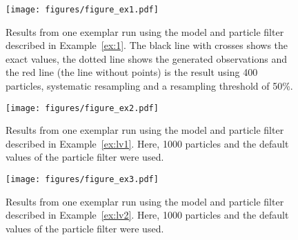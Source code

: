 \begin{landscape}
  \begin{figure}
    \centering
    \texttt{[image: figures/figure\_ex1.pdf]}
    \caption{Results from one exemplar run using the model and
      particle filter described in Example~\ref{ex:1}. The black line
      with crosses shows the exact values, the dotted line shows the
      generated observations and the red line (the line without
      points) is the result using 400 particles, systematic resampling
      and a resampling threshold of 50\%.}%
    \label{fig:ex1}
  \end{figure}
\end{landscape}

\begin{landscape}
  \begin{figure}
    \centering
    \texttt{[image: figures/figure\_ex2.pdf]}
    \caption{Results from one exemplar run using the model and
      particle filter described in Example~\ref{ex:lv1}. Here, 1000
      particles and the default values of the particle filter were
      used.}%
    \label{fig:ex2}
  \end{figure}
\end{landscape}

\begin{landscape}
  \begin{figure}
    \centering
    \texttt{[image: figures/figure\_ex3.pdf]}
    \caption{Results from one exemplar run using the model and
      particle filter described in Example~\ref{ex:lv2}. Here, 1000
      particles and the default values of the particle filter were
      used.}%
    \label{fig:ex3}
  \end{figure}
\end{landscape}


 















































